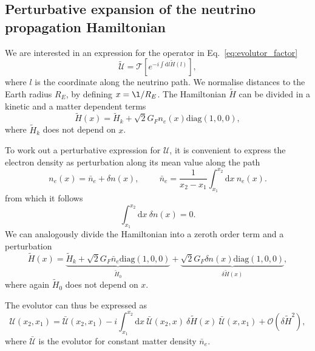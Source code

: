 \documentclass[11pt,a4paper]{article}
\newcommand{\de}[0]{\text{d}}
\begin{document}
\subsection{Perturbative expansion of the neutrino propagation Hamiltonian}
We are interested in an expression for the operator in Eq.~\ref{eq:evolutor_factor}
\begin{equation}\label{eq:evolutor_12-13}
	\tilde{\mathcal{U}} = \mathcal{T} \left[ e^{- i \int \de l \tilde{H}(l)} \right],
\end{equation}
where $l$ is the coordinate along the neutrino path. We normalise distances to the Earth radius $R_E$, by defining $x = \l/R_E$. The Hamiltonian $\tilde{H}$ can be divided in a kinetic and a matter dependent terms
\begin{equation}
	\tilde{H}(x) = \tilde{H}_k + \sqrt{2} G_F n_e(x)\text{diag}(1,0,0),
\end{equation}
where $\tilde{H}_k$ does not depend on $x$.

To work out a perturbative expression for $\mathcal{U}$, it is convenient to express the electron density as perturbation along its mean value along the path~\cite{Lisi:1997yc}
\begin{equation}
	n_e(x) = \bar{n}_e + \delta n(x), \hspace{1cm} \bar{n}_e =\frac{1}{x_2-x_1} \int_{x_1}^{x_2} \de x \ n_e(x).
\end{equation}
from which it follows
\begin{equation}
	\int_{x_1}^{x_2} \de x\ \delta n(x) = 0.
\end{equation} 
We can analogously divide the Hamiltonian into a zeroth order term and a perturbation
\begin{equation}
	\tilde{H}(x) = \underbrace{\tilde{H}_k + \sqrt{2}G_F \bar{n}_e \text{diag}(1,0,0)}_{\tilde{H}_0} + \underbrace{\sqrt{2}G_F \delta n(x) \text{diag}(1,0,0)}_{\delta \tilde{H}(x)},
\end{equation}
where again $\tilde{H}_0$ does not depend on $x$.

The evolutor can thus be expressed as~\cite{Lisi:1997yc}
\begin{equation}
	\mathcal{U}(x_2,x_1) = \bar{\mathcal{U}}(x_2,x_1) - i \int_{x_1}^{x_2} \de x\ \bar{\mathcal{U}}(x_2,x)\ \delta \tilde{H}(x)\ \bar{\mathcal{U}}(x,x_1) + \mathcal{O}(\delta\tilde{H}^2),\label{eq:evolutor_1}
\end{equation}
where $\bar{\mathcal{U}}$ is the evolutor for constant matter density $\bar{n}_e$.
\end{document}
